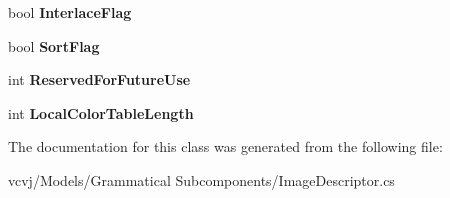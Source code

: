 \begin{DoxyCompactItemize}
\item 
bool {\bfseries Interlace\+Flag}\hypertarget{classvcvj_1_1_models_1_1_grammatical___subcomponents_1_1_image_descriptor_a0ae70da55f68a691b4a4813dd3bb5032}{}\label{classvcvj_1_1_models_1_1_grammatical___subcomponents_1_1_image_descriptor_a0ae70da55f68a691b4a4813dd3bb5032}

\item 
bool {\bfseries Sort\+Flag}\hypertarget{classvcvj_1_1_models_1_1_grammatical___subcomponents_1_1_image_descriptor_aef8028c8256023b093f28d47f6b64b2a}{}\label{classvcvj_1_1_models_1_1_grammatical___subcomponents_1_1_image_descriptor_aef8028c8256023b093f28d47f6b64b2a}

\item 
int {\bfseries Reserved\+For\+Future\+Use}\hypertarget{classvcvj_1_1_models_1_1_grammatical___subcomponents_1_1_image_descriptor_a54f2233309eecfffda5779e8f419536a}{}\label{classvcvj_1_1_models_1_1_grammatical___subcomponents_1_1_image_descriptor_a54f2233309eecfffda5779e8f419536a}

\item 
int {\bfseries Local\+Color\+Table\+Length}\hypertarget{classvcvj_1_1_models_1_1_grammatical___subcomponents_1_1_image_descriptor_ae3636ab9082c33e5d04cfa33c85be44c}{}\label{classvcvj_1_1_models_1_1_grammatical___subcomponents_1_1_image_descriptor_ae3636ab9082c33e5d04cfa33c85be44c}

\end{DoxyCompactItemize}


The documentation for this class was generated from the following file\+:\begin{DoxyCompactItemize}
\item 
vcvj/\+Models/\+Grammatical Subcomponents/Image\+Descriptor.\+cs\end{DoxyCompactItemize}
